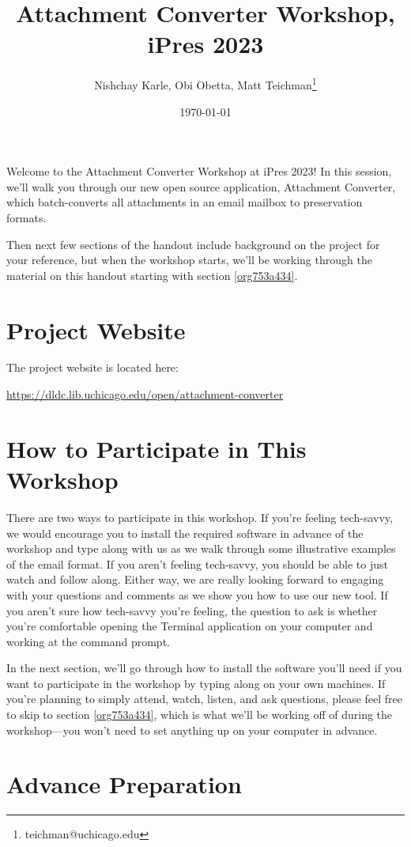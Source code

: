 \documentclass[11pt]{article}
\author{Nishchay Karle, Obi Obetta, Matt Teichman\thanks{teichman@uchicago.edu}}
\date{\today}
\title{Attachment Converter Workshop, iPres 2023}
\begin{document}
\maketitle
Welcome to the Attachment Converter Workshop at iPres 2023!  In this
session, we'll walk you through our new open source application,
Attachment Converter, which batch-converts all attachments in an email
mailbox to preservation formats.

Then next few sections of the handout include background on the
project for your reference, but when the workshop starts, we'll be
working through the material on this handout starting with section
\ref{org753a434}.

\section{Project Website}
\label{sec:orgd80eb4c}

The project website is located here:

\url{https://dldc.lib.uchicago.edu/open/attachment-converter}


\section{How to Participate in This Workshop}
\label{sec:orgf7902f1}

There are two ways to participate in this workshop.  If you're feeling
tech-savvy, we would encourage you to install the required software in
advance of the workshop and type along with us as we walk through some
illustrative examples of the email format.  If you aren't feeling
tech-savvy, you should be able to just watch and follow along.  Either
way, we are really looking forward to engaging with your questions and
comments as we show you how to use our new tool. If you aren't sure
how tech-savvy you're feeling, the question to ask is whether you're
comfortable opening the Terminal application on your computer and
working at the command prompt.

In the next section, we'll go through how to install the software
you'll need if you want to participate in the workshop by typing along
on your own machines.  If you're planning to simply attend, watch,
listen, and ask questions, please feel free to skip to section
\ref{org753a434}, which is what we'll be working off of during the
workshop---you won't need to set anything up on your computer in
advance.

\section{Advance Preparation \label{orga2f38c7}}
\label{sec:orgdd2a85f}
\end{document}

